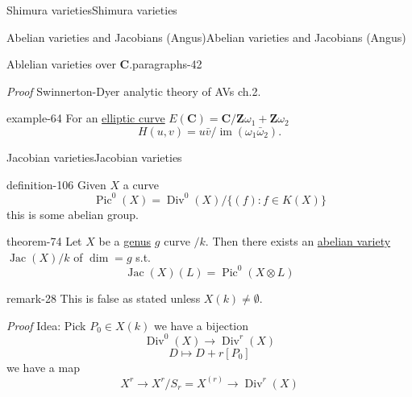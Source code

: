 \documentclass[10pt,]{book}
\makeatletter
\renewcommand*{\proofname}{Proof}
\renewenvironment{proof}[1][\proofname]{\par
  \pushQED{\qed}%
  \normalfont \topsep6\p@\@plus6\p@\relax
  \trivlist
  \item\relax
    {\itshape
    #1\@addpunct{.}}\hspace\labelsep\ignorespaces
}{%
  \popQED\endtrivlist\@endpefalse
}
\numberwithin{equation}{section}
\newcommand{\ZZ}{\mathbf{Z}}
\newcommand{\CC}{\mathbf{C}}
\DeclareMathOperator{\divisors}{Div}
\DeclareMathOperator{\Pic}{Pic}
\DeclareMathOperator{\Jac}{Jac}
\DeclareMathOperator{\im}{im}
\makeatother
\begin{document}
\begin{chapterptx}{Shimura varieties}{}{Shimura varieties}{}{}
\begin{sectionptx}{Abelian varieties and Jacobians (Angus)}{}{Abelian varieties and Jacobians (Angus)}{}{}
\begin{paragraphs}{Ablelian varieties over \(\CC\).}{paragraphs-42}
\begin{proof}\hypertarget{proof-112}{}
\hypertarget{p-1100}{}%
Swinnerton-Dyer analytic theory of AVs ch.2.%
\end{proof}
\begin{example}{}{example-64}%
\hypertarget{p-1101}{}%
For an \hyperref[def-supersing-isog-ec]{elliptic curve} \(E(\CC) = \CC/ \ZZ \omega_1 + \ZZ \omega_2\)%
\begin{equation*}
H(u,v) = u\bar v/ \im(\omega_1 \bar \omega_2)\text{.}
\end{equation*}
%
\end{example}
\end{paragraphs}%
%
%
\typeout{************************************************}
\typeout{************************************************}
%
\begin{subsectionptx}{Jacobian varieties}{}{Jacobian varieties}{}{}\label{subsection-78}
\begin{definition}{}{definition-106}%
\hypertarget{p-1102}{}%
Given \(X\) a curve%
\begin{equation*}
\Pic^0(X) = \divisors^0(X)/\{(f) : f \in K(X)\}
\end{equation*}
this is some abelian group.%
\end{definition}
\begin{theorem}{}{}{theorem-74}%
\hypertarget{p-1103}{}%
Let \(X\) be a \hyperref[def-class-set]{genus} \(g\) curve \(/k\). Then there exists an \hyperref[def-buntes-abvar]{abelian variety} \(\Jac(X)/k\) of \(\dim = g\) s.t.%
\begin{equation*}
\Jac(X)(L) = \Pic^0(X\otimes L)
\end{equation*}
%
\end{theorem}
\begin{remark}{}{remark-28}%
\hypertarget{p-1104}{}%
This is false as stated unless \(X(k) \ne \emptyset\).%
\end{remark}
\begin{proof}\hypertarget{proof-113}{}
\hypertarget{p-1105}{}%
Idea: Pick \(P_0 \in X(k)\) we have a bijection%
\begin{equation*}
\divisors^0(X) \to \divisors^r(X)
\end{equation*}
%
\begin{equation*}
D \mapsto D + r[P_0]
\end{equation*}
we have  a map%
\begin{equation*}
X^r \to X^r/ S_r = X^{(r)} \to \divisors^r(X)
\end{equation*}

\end{proof}
\end{subsectionptx}
\end{sectionptx}
\end{chapterptx}
\end{document}
